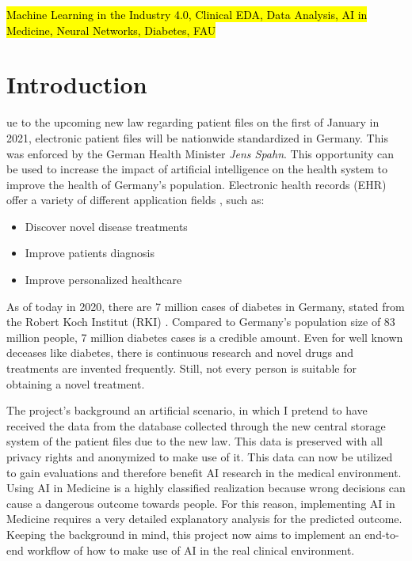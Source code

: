 \documentclass[journal]{IEEEtran}
\begin{document}
\begin{IEEEkeywords}
\hl{Machine Learning in the Industry 4.0, Clinical EDA, Data Analysis, AI in Medicine, Neural Networks, Diabetes, FAU}
\end{IEEEkeywords}

\IEEEpeerreviewmaketitle

\section{Introduction}
ue to the upcoming new law regarding patient files on the first of January in 2021, electronic patient files will be nationwide standardized in Germany. This was enforced by the German Health Minister \textit{Jens Spahn}. This opportunity can be used to increase the impact of artificial intelligence on the health system to improve the health of Germany's population. Electronic health records (EHR) offer a variety of different application fields \cite{cite1} \cite{cite2}, such as: \\

\begin{itemize}
	\item Discover novel disease treatments
	\item Improve patients diagnosis
	\item Improve personalized healthcare \\
\end{itemize}

As of today in 2020, there are 7 million cases of diabetes in Germany, stated from the Robert Koch Institut (RKI) \cite{diab}. Compared to Germany's population size of 83 million people, 7 million diabetes cases is a credible amount. Even for well known deceases like diabetes, there is continuous research and novel drugs and treatments are invented frequently. Still, not every person is suitable for obtaining a novel treatment. 

The project's background an artificial scenario, in which I pretend to have received the data from the database collected through the new central storage system of the patient files due to the new law. This data is preserved with all privacy rights and anonymized to make use of it. This data can now be utilized to gain evaluations and therefore benefit AI research in the medical environment. Using AI in Medicine is a highly classified realization because wrong decisions can cause a dangerous outcome towards people. For this reason, implementing AI in Medicine requires a very detailed explanatory analysis for the predicted outcome. Keeping the background in mind, this project now aims to implement an end-to-end workflow of how to make use of AI in the real clinical environment. 
\end{document}
